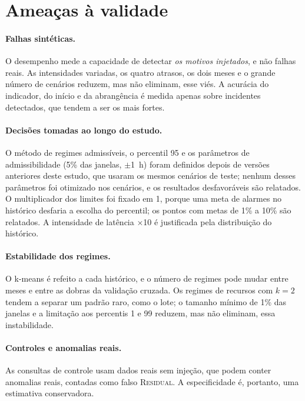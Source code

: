 \documentclass[sigconf,nonacm]{acmart}
\newcommand{\Residual}{\textsc{Residual}\xspace}
\begin{document}
\section{Ameaças à validade}\label{sec:ameacas}

\paragraph{Falhas sintéticas.} O desempenho mede a capacidade de detectar \emph{os motivos injetados}, e não falhas reais. As intensidades variadas, os quatro atrasos, os dois meses e o grande número de cenários reduzem, mas não eliminam, esse viés. A acurácia do indicador, do início e da abrangência é medida apenas sobre incidentes detectados, que tendem a ser os mais fortes.

\paragraph{Decisões tomadas ao longo do estudo.} O método de regimes admissíveis, o percentil 95 e os parâmetros de admissibilidade (5\% das janelas, $\pm$1~h) foram definidos depois de versões anteriores deste estudo, que usaram os mesmos cenários de teste; nenhum desses parâmetros foi otimizado nos cenários, e os resultados desfavoráveis são relatados. O multiplicador dos limites foi fixado em 1, porque uma meta de alarmes no histórico desfaria a escolha do percentil; os pontos com metas de 1\% a 10\% são relatados. A intensidade de latência $\times$10 é justificada pela distribuição do histórico.

\paragraph{Estabilidade dos regimes.} O k-means é refeito a cada histórico, e o número de regimes pode mudar entre meses e entre as dobras da validação cruzada. Os regimes de recursos com $k=2$ tendem a separar um padrão raro, como o lote; o tamanho mínimo de 1\% das janelas e a limitação aos percentis 1 e 99 reduzem, mas não eliminam, essa instabilidade.

\paragraph{Controles e anomalias reais.} As consultas de controle usam dados reais sem injeção, que podem conter anomalias reais, contadas como falso \Residual. A especificidade é, portanto, uma estimativa conservadora.
\end{document}
